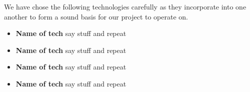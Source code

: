 We have chose the following technologies carefully as they incorporate into one another to form a sound basis for our project to operate on.

\begin{itemize}
	\item \textbf{Name of tech}
	say stuff and repeat
	\item \textbf{Name of tech}
	say stuff and repeat
	\item \textbf{Name of tech}
	say stuff and repeat
	\item \textbf{Name of tech}
	say stuff and repeat
\end{itemize}